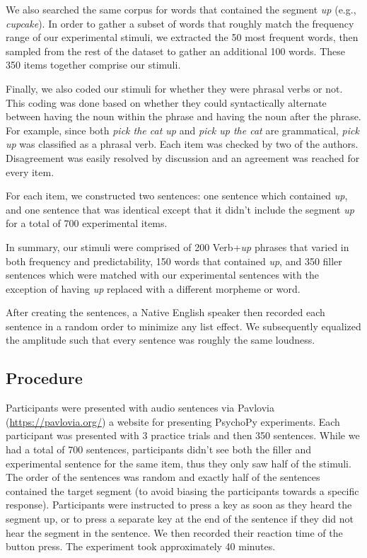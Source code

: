 \documentclass[
  man,floatsintext]{apa6}
\begin{document}
We also searched the same corpus for words that contained the segment \emph{up} (e.g., \emph{cupcake}). In order to gather a subset of words that roughly match the frequency range of our experimental stimuli, we extracted the 50 most frequent words, then sampled from the rest of the dataset to gather an additional 100 words. These 350 items together comprise our stimuli.

Finally, we also coded our stimuli for whether they were phrasal verbs or not. This coding was done based on whether they could syntactically alternate between having the noun within the phrase and having the noun after the phrase. For example, since both \emph{pick the cat up} and \emph{pick up the cat} are grammatical, \emph{pick up} was classified as a phrasal verb. Each item was checked by two of the authors. Disagreement was easily resolved by discussion and an agreement was reached for every item.

For each item, we constructed two sentences: one sentence which contained \emph{up}, and one sentence that was identical except that it didn't include the segment \emph{up} for a total of 700 experimental items.

In summary, our stimuli were comprised of 200 Verb+\emph{up} phrases that varied in both frequency and predictability, 150 words that contained \emph{up}, and 350 filler sentences which were matched with our experimental sentences with the exception of having \emph{up} replaced with a different morpheme or word.

After creating the sentences, a Native English speaker then recorded each sentence in a random order to minimize any list effect. We subsequently equalized the amplitude such that every sentence was roughly the same loudness.

\hypertarget{procedure}{%
\subsection{Procedure}\label{procedure}}

Participants were presented with audio sentences via Pavlovia (\url{https://pavlovia.org/}) a website for presenting PsychoPy experiments. Each participant was presented with 3 practice trials and then 350 sentences. While we had a total of 700 sentences, participants didn't see both the filler and experimental sentence for the same item, thus they only saw half of the stimuli. The order of the sentences was random and exactly half of the sentences contained the target segment (to avoid biasing the participants towards a specific response). Participants were instructed to press a key as soon as they heard the segment up, or to press a separate key at the end of the sentence if they did not hear the segment in the sentence. We then recorded their reaction time of the button press. The experiment took approximately 40 minutes.
\end{document}
